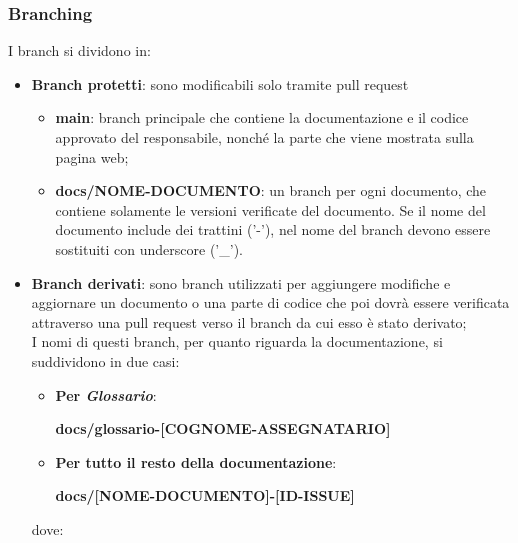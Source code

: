 \subsubsection{Branching}\label{inf:branch}
I branch si dividono in:
\begin{itemize}
      \item \textbf{Branch protetti}: sono modificabili solo tramite pull request
            \begin{itemize}
                  \item \textbf{main}: branch principale che contiene la documentazione e il codice approvato del responsabile,
                        nonché la parte che viene mostrata sulla pagina web;
                  \item \textbf{docs/NOME-DOCUMENTO}: un branch per ogni documento, che contiene solamente le versioni verificate del documento.
                        Se il nome del documento include dei trattini ('-'), nel nome del branch devono essere sostituiti con underscore ('\_').
            \end{itemize}
      \item \textbf{Branch derivati}: sono branch utilizzati per aggiungere modifiche e aggiornare un documento o una parte di codice che poi dovrà essere verificata
            attraverso una pull request verso il branch da cui esso è stato derivato;\\
            I nomi di questi branch, per quanto riguarda la documentazione, si suddividono in due casi:
            \begin{itemize}
                  \item \textbf{Per \textit{Glossario}}:
                        \begin{center}
                              \textbf{docs/glossario-[COGNOME-ASSEGNATARIO]}
                        \end{center}
                  \item \textbf{Per tutto il resto della documentazione}:
                        \begin{center}
                              \textbf{docs/[NOME-DOCUMENTO]-[ID-ISSUE]}
                        \end{center}
            \end{itemize}
            dove:


\end{itemize}
